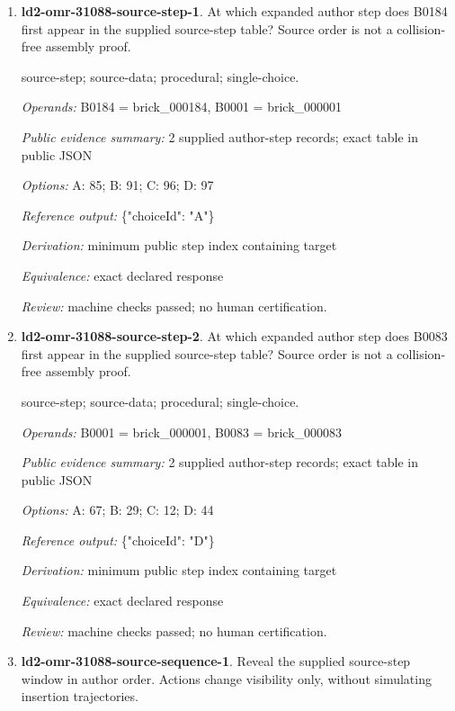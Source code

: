 \begin{enumerate}
\item \textbf{ld2-omr-31088-source-step-1}. At which expanded author step does B0184 first appear in the supplied source-step table? Source order is not a collision-free assembly proof.
\par{\small source-step; source-data; procedural; single-choice.\par\textit{Operands:} B0184 = brick\_000184, B0001 = brick\_000001\par\textit{Public evidence summary:} 2 supplied author-step records; exact table in public JSON\par\textit{Options:} A: 85; B: 91; C: 96; D: 97\par\textit{Reference output:} \{"choiceId": "A"\}\par\textit{Derivation:} minimum public step index containing target\par\textit{Equivalence:} exact declared response\par\textit{Review:} machine checks passed; no human certification.}
\item \textbf{ld2-omr-31088-source-step-2}. At which expanded author step does B0083 first appear in the supplied source-step table? Source order is not a collision-free assembly proof.
\par{\small source-step; source-data; procedural; single-choice.\par\textit{Operands:} B0001 = brick\_000001, B0083 = brick\_000083\par\textit{Public evidence summary:} 2 supplied author-step records; exact table in public JSON\par\textit{Options:} A: 67; B: 29; C: 12; D: 44\par\textit{Reference output:} \{"choiceId": "D"\}\par\textit{Derivation:} minimum public step index containing target\par\textit{Equivalence:} exact declared response\par\textit{Review:} machine checks passed; no human certification.}
\item \textbf{ld2-omr-31088-source-sequence-1}. Reveal the supplied source-step window in author order. Actions change visibility only, without simulating insertion trajectories.

\end{enumerate}
